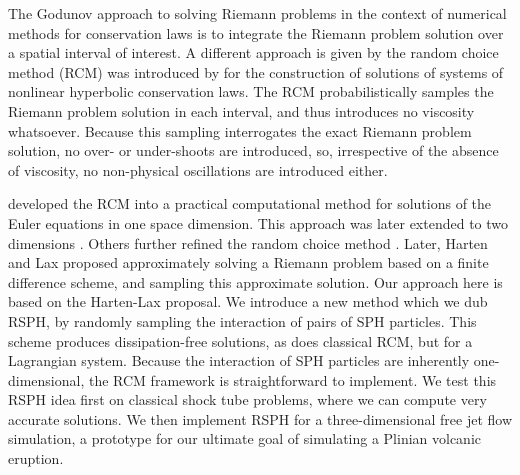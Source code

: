\documentclass[review]{elsarticle}
\begin{document}
The Godunov approach to solving Riemann problems in the context of numerical methods for conservation laws is to 
integrate the Riemann problem solution over a spatial interval of interest. A different approach is given by
the 
random choice method (RCM) was introduced by \citet{glimm1965solutions} for the construction of solutions of systems of nonlinear hyperbolic conservation laws. The RCM probabilistically samples the
Riemann problem solution in each interval, and thus introduces no viscosity whatsoever. Because this
sampling interrogates the exact Riemann problem solution, no over- or under-shoots are introduced,
so, irrespective of the absence of viscosity, no non-physical oscillations are introduced either.


\citet{chorin1976random} developed the RCM into a practical computational method for solutions of the Euler equations in one space dimension.
This approach was later extended to two dimensions \cite{chorinporousmedium}. Others
further refined the random choice method \citep{sod1977numerical,concus1979numerical,colella1982glimm, freistuhler1992numerical,toro2013riemann}. 
%
Later, Harten and Lax \cite{hartenlax} proposed approximately solving a Riemann problem based 
on a finite difference scheme, and sampling this approximate solution. Our approach here 
is based on the Harten-Lax proposal. 
We introduce a new method which we dub RSPH, by randomly sampling the interaction
of pairs of SPH particles. 
This scheme produces dissipation-free solutions, as does classical RCM, but for a Lagrangian 
system.
 Because the 
interaction of SPH particles are inherently one-dimensional, the RCM framework
is straightforward to implement.
We test this RSPH idea first on classical shock tube problems, where we can compute very accurate
solutions.
We then implement RSPH for a three-dimensional free jet flow simulation, a prototype for
our ultimate goal of simulating a
Plinian volcanic eruption.

\end{document}
